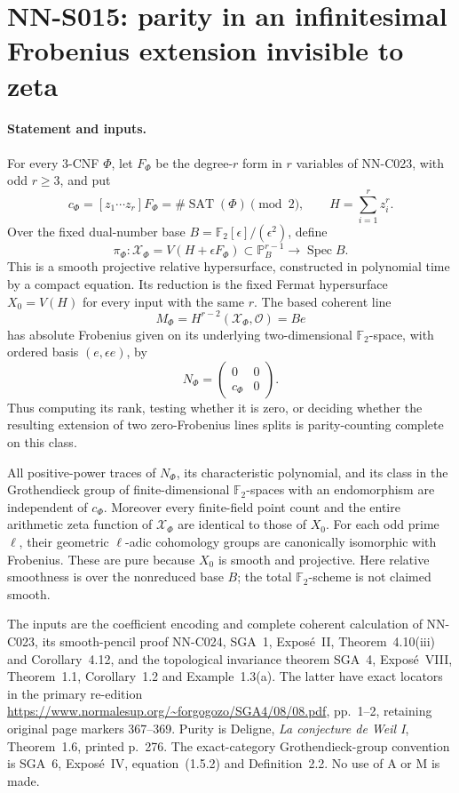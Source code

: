 \section{NN-S015: parity in an infinitesimal Frobenius extension invisible to zeta}

\paragraph{Statement and inputs.}
For every 3-CNF $\Phi$, let $F_\Phi$ be the degree-$r$ form in
$r$ variables of NN-C023, with odd $r\ge3$, and put
\[
 c_\Phi=[z_1\cdots z_r]F_\Phi
       =\#\operatorname{SAT}(\Phi)\pmod2,\qquad
 H=\sum_{i=1}^r z_i^r.
\]
Over the fixed dual-number base
$B=\mathbb F_2[\epsilon]/(\epsilon^2)$, define
\[
 \pi_\Phi:\mathcal X_\Phi
   =V(H+\epsilon F_\Phi)\subset\mathbb P^{r-1}_B
                  \longrightarrow\operatorname{Spec}B.
\]
This is a smooth projective relative hypersurface, constructed in
polynomial time by a compact equation. Its reduction is the fixed
Fermat hypersurface $X_0=V(H)$ for every input with the same $r$.
The based coherent line
\[
 M_\Phi=H^{r-2}(\mathcal X_\Phi,\mathcal O)=B e
\]
has absolute Frobenius given on its underlying two-dimensional
$\mathbb F_2$-space, with ordered basis $(e,\epsilon e)$, by
\[
       N_\Phi=
       \begin{pmatrix}0&0\\c_\Phi&0\end{pmatrix}.       \tag{S015.1}
\]
Thus computing its rank, testing whether it is zero, or deciding whether
the resulting extension of two zero-Frobenius lines splits is
parity-counting complete on this class.

All positive-power traces of $N_\Phi$, its characteristic polynomial,
and its class in the Grothendieck group of finite-dimensional
$\mathbb F_2$-spaces with an endomorphism are independent of $c_\Phi$.
Moreover every finite-field point count and the entire arithmetic zeta
function of $\mathcal X_\Phi$ are identical to those of $X_0$.
For each odd prime $\ell$, their geometric $\ell$-adic cohomology groups
are canonically isomorphic with Frobenius. These are pure because $X_0$
is smooth and projective. Here relative smoothness is over the
nonreduced base $B$; the total $\mathbb F_2$-scheme is not claimed smooth.

The inputs are the coefficient encoding and complete coherent calculation
of NN-C023, its smooth-pencil proof NN-C024, SGA~1, Expos\'e~II,
Theorem~4.10(iii) and Corollary~4.12, and the topological invariance
theorem SGA~4, Expos\'e~VIII, Theorem~1.1, Corollary~1.2 and
Example~1.3(a). The latter have exact locators in the primary re-edition
\url{https://www.normalesup.org/~forgogozo/SGA4/08/08.pdf},
pp.~1--2, retaining original page markers 367--369.
Purity is Deligne, \emph{La conjecture de Weil I}, Theorem~1.6,
printed p.~276. The exact-category Grothendieck-group convention is
SGA~6, Expos\'e~IV, equation~(1.5.2) and Definition~2.2.
No use of A or M is made.

